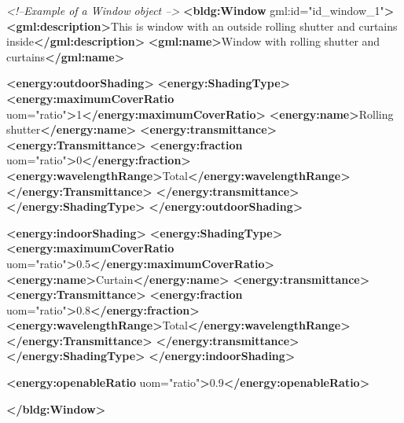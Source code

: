 \documentclass[a4paper,12pt]{article}
\newenvironment{Shaded}{}{}
\newcommand{\KeywordTok}[1]{\textcolor[rgb]{0.00,0.44,0.13}{\textbf{{#1}}}}
\newcommand{\StringTok}[1]{\textcolor[rgb]{0.25,0.44,0.63}{{#1}}}
\newcommand{\CommentTok}[1]{\textcolor[rgb]{0.38,0.63,0.69}{\textit{{#1}}}}
\newcommand{\OtherTok}[1]{\textcolor[rgb]{0.00,0.44,0.13}{{#1}}}
\newcommand{\NormalTok}[1]{{#1}}
\begin{document}
\begin{Shaded}
\begin{Highlighting}[]
\CommentTok{<!--Example of a Window object -->}
\KeywordTok{<bldg:Window}\OtherTok{ gml:id=}\StringTok{"id_window_1"}\KeywordTok{>}
    \KeywordTok{<gml:description>}\NormalTok{This is window with an outside rolling shutter and curtains inside}\KeywordTok{</gml:description>}
    \KeywordTok{<gml:name>}\NormalTok{Window with rolling shutter and curtains}\KeywordTok{</gml:name>}

    \KeywordTok{<energy:outdoorShading>}
        \KeywordTok{<energy:ShadingType>}
            \KeywordTok{<energy:maximumCoverRatio}\OtherTok{ uom=}\StringTok{"ratio"}\KeywordTok{>}\NormalTok{1}\KeywordTok{</energy:maximumCoverRatio>}
            \KeywordTok{<energy:name>}\NormalTok{Rolling shutter}\KeywordTok{</energy:name>}
            \KeywordTok{<energy:transmittance>}
                \KeywordTok{<energy:Transmittance>}
                    \KeywordTok{<energy:fraction}\OtherTok{ uom=}\StringTok{"ratio"}\KeywordTok{>}\NormalTok{0}\KeywordTok{</energy:fraction>}
                    \KeywordTok{<energy:wavelengthRange>}\NormalTok{Total}\KeywordTok{</energy:wavelengthRange>}
                \KeywordTok{</energy:Transmittance>}
            \KeywordTok{</energy:transmittance>}
        \KeywordTok{</energy:ShadingType>}
    \KeywordTok{</energy:outdoorShading>}

    \KeywordTok{<energy:indoorShading>}
        \KeywordTok{<energy:ShadingType>}
            \KeywordTok{<energy:maximumCoverRatio}\OtherTok{ uom=}\StringTok{"ratio"}\KeywordTok{>}\NormalTok{0.5}\KeywordTok{</energy:maximumCoverRatio>}
            \KeywordTok{<energy:name>}\NormalTok{Curtain}\KeywordTok{</energy:name>}
            \KeywordTok{<energy:transmittance>}
                \KeywordTok{<energy:Transmittance>}
                    \KeywordTok{<energy:fraction}\OtherTok{ uom=}\StringTok{"ratio"}\KeywordTok{>}\NormalTok{0.8}\KeywordTok{</energy:fraction>}
                    \KeywordTok{<energy:wavelengthRange>}\NormalTok{Total}\KeywordTok{</energy:wavelengthRange>}
                \KeywordTok{</energy:Transmittance>}
            \KeywordTok{</energy:transmittance>}
        \KeywordTok{</energy:ShadingType>}
    \KeywordTok{</energy:indoorShading>}

    \KeywordTok{<energy:openableRatio}\OtherTok{ uom=}\StringTok{"ratio"}\KeywordTok{>}\NormalTok{0.9}\KeywordTok{</energy:openableRatio>}

\KeywordTok{</bldg:Window>}
\end{Highlighting}
\end{Shaded}
\end{document}

